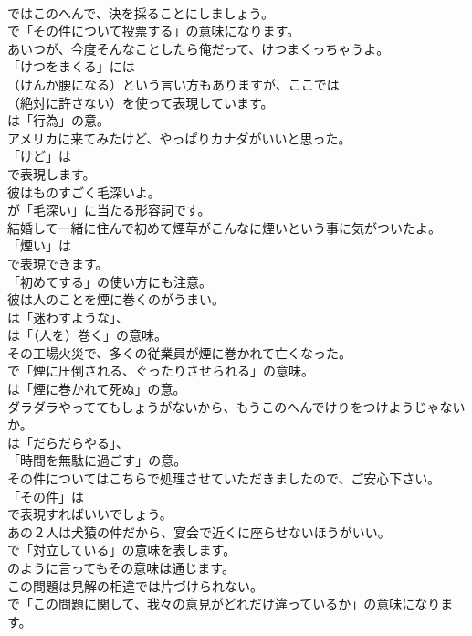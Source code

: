 \documentclass[8pt]{extreport}
\begin{document}
\begin{CJK}{UTF8}{min}
\\	ではこのへんで、決を採ることにしましょう。 
\\	で「その件について投票する」の意味になります。	
\\	あいつが、今度そんなことしたら俺だって、けつまくっちゃうよ。 
\\	「けつをまくる」には 
\\	（けんか腰になる）という言い方もありますが、ここでは 
\\	（絶対に許さない）を使って表現しています。
\\	は「行為」の意。	
\\	アメリカに来てみたけど、やっぱりカナダがいいと思った。 
\\	「けど」は
\\	で表現します。	
\\	彼はものすごく毛深いよ。 
\\	が「毛深い」に当たる形容詞です。	
\\	結婚して一緒に住んで初めて煙草がこんなに煙いという事に気がついたよ。 
\\	「煙い」は
\\	で表現できます。
\\	「初めてする」の使い方にも注意。	
\\	彼は人のことを煙に巻くのがうまい。 
\\	は「迷わすような」、
\\	は「（人を）巻く」の意味。	
\\	その工場火災で、多くの従業員が煙に巻かれて亡くなった。 
\\	で「煙に圧倒される、ぐったりさせられる」の意味。
\\	は「煙に巻かれて死ぬ」の意。	
\\	ダラダラやっててもしょうがないから、もうこのへんでけりをつけようじゃないか。 
\\	は「だらだらやる」、
\\	「時間を無駄に過ごす」の意。	
\\	その件についてはこちらで処理させていただきましたので、ご安心下さい｡ 
\\	「その件」は 
\\	で表現すればいいでしょう。	
\\	あの２人は犬猿の仲だから、宴会で近くに座らせないほうがいい。 
\\	で「対立している」の意味を表します。
\\	のように言ってもその意味は通じます。	
\\	この問題は見解の相違では片づけられない。 
\\	で「この問題に関して、我々の意見がどれだけ違っているか」の意味になります。	

\end{CJK}
\end{document}

